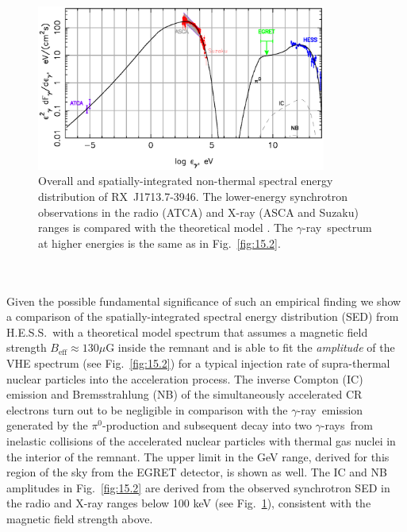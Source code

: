 \documentclass{svjour3x}                     %
\newcommand{\gr}{$\gamma$-ray}
\newcommand{\grs}{$\gamma$-rays}
\newcommand{\rxj}{RX~J1713.7-3946}
\newcommand{\hess}{H.E.S.S.}
\begin{document}
\begin{figure}%
\begin{center}
  \includegraphics[width=0.85\textwidth]{0444fig2.eps}
\end{center}
  \caption[Energy distribution of \rxj]{Overall and spatially-integrated non-thermal spectral energy
   distribution of \rxj. The lower-energy synchrotron observations in the radio
   (ATCA) and X-ray (ASCA and Suzaku) ranges is compared with the theoretical
   model \cite{bv08}. The \gr\ spectrum at higher energies is the same as in
   Fig.~\ref{fig:15.2}. \\ ~ \\[1.5ex] ~}
  \label{fig:16}       %
\end{figure}

Given the possible fundamental significance of such an empirical finding we
show a comparison of the spatially-integrated spectral energy distribution
(SED) from \hess\ with a theoretical model spectrum \cite{bv06,bv08} that
assumes a magnetic field strength $B_{\mathrm{eff}} \approx 130 \mu$G inside
the remnant and is able to fit the {\it amplitude } of the VHE spectrum (see
Fig.~\ref{fig:15.2}) for a typical injection rate of supra-thermal nuclear
particles into the acceleration process. The inverse Compton (IC) emission and
Bremsstrahlung (NB) of the simultaneously accelerated CR electrons turn out to
be negligible in comparison with the \gr\ emission generated by the
$\pi^0$-production and subsequent decay into two \grs\ from inelastic
collisions of the accelerated nuclear particles with thermal gas nuclei in the
interior of the remnant. The upper limit in the GeV range, derived for this
region of the sky from the EGRET detector, is shown as well. The IC and NB
amplitudes in Fig.~\ref{fig:15.2} are derived from the observed synchrotron SED
in the radio and X-ray ranges below 100 keV (see Fig.~\ref{fig:16}), consistent
with the magnetic field strength above.
\end{document}
